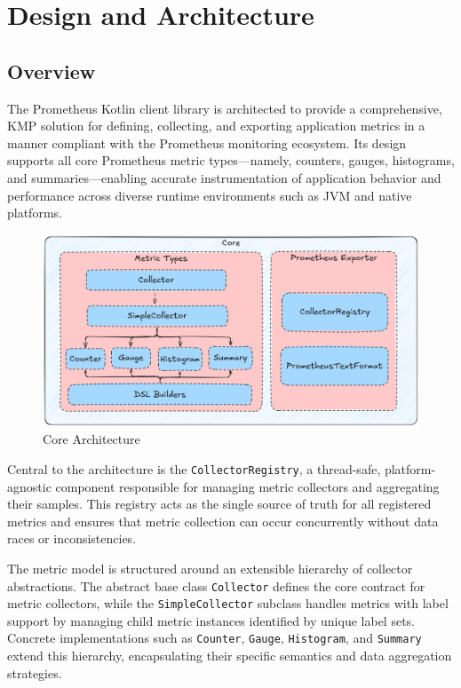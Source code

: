 \chapter{Design and Architecture} \label{ch:architecture}

\section{Overview}\label{sec:overview}

The Prometheus Kotlin client library is architected to provide a comprehensive, \ac{KMP} solution for
defining, collecting, and exporting application metrics in a manner compliant with the Prometheus monitoring ecosystem.
Its design supports all core Prometheus metric types—namely, counters, gauges, histograms, and summaries—enabling
accurate instrumentation of application behavior and performance across diverse runtime environments such as \ac{JVM} and native platforms.

\begin{figure}[H]
    \centering
    \includegraphics[width=\linewidth, keepaspectratio]{./figures/core_arch}
    \caption{Core Architecture}
\end{figure}

Central to the architecture is the \texttt{CollectorRegistry}, a thread-safe, platform-agnostic component responsible for managing metric collectors and aggregating their samples.
This registry acts as the single source of truth for all registered metrics and ensures that metric collection can occur concurrently without data races or inconsistencies.

The metric model is structured around an extensible hierarchy of collector abstractions.
The abstract base class \texttt{Collector} defines the core contract for metric collectors, while the \texttt{SimpleCollector} subclass handles metrics with label support by managing child metric instances identified by unique label sets.
Concrete implementations such as \texttt{Counter}, \texttt{Gauge}, \texttt{Histogram}, and \texttt{Summary} extend this hierarchy, encapsulating their specific semantics and data aggregation strategies.

